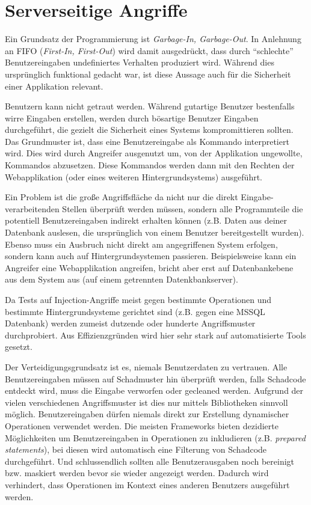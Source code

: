 \chapter{Serverseitige Angriffe}

Ein Grundsatz der Programmierung ist \textit{Garbage-In, Garbage-Out}. In Anlehnung an FIFO (\textit{First-In, First-Out}) wird damit ausgedrückt, dass durch ``schlechte'' Benutzereingaben undefiniertes Verhalten produziert wird. Während dies ursprünglich funktional gedacht war, ist diese Aussage auch für die Sicherheit einer Applikation relevant.

Benutzern kann nicht getraut werden. Während gutartige Benutzer bestenfalls wirre Eingaben erstellen, werden durch bösartige Benutzer Eingaben durchgeführt, die gezielt die Sicherheit eines Systems kompromittieren sollten. Das Grundmuster ist, dass eine Benutzereingabe als Kommando interpretiert wird. Dies wird durch Angreifer ausgenutzt um, von der Applikation ungewollte, Kommandos abzusetzen. Diese Kommandos werden dann mit den Rechten der Webapplikation (oder eines weiteren Hintergrundsystems) ausgeführt.

Ein Problem ist die große Angriffsfläche da nicht nur die direkt Eingabe-verarbeitenden Stellen überprüft werden müssen, sondern alle Programmteile die potentiell Benutzereingaben indirekt erhalten können (z.B. Daten aus deiner Datenbank auslesen, die ursprünglich von einem Benutzer bereitgestellt wurden). Ebenso muss ein Ausbruch nicht direkt am angegriffenen System erfolgen, sondern kann auch auf Hintergrundsystemen passieren. Beispielsweise kann ein Angreifer eine Webapplikation angreifen, bricht aber erst auf Datenbankebene aus dem System aus (auf einem getrennten Datenkbankserver).

Da Tests auf Injection-Angriffe meist gegen bestimmte Operationen und bestimmte Hintergrundsysteme gerichtet sind (z.B. gegen eine MSSQL Datenbank) werden zumeist dutzende oder hunderte Angriffsmuster durchprobiert. Aus Effizienzgründen wird hier sehr stark auf automatisierte Tools gesetzt.

Der Verteidigungsgrundsatz ist es, niemals Benutzerdaten zu vertrauen. Alle Benutzereingaben müssen auf Schadmuster hin überprüft werden, falls Schadcode entdeckt wird, muss die Eingabe verworfen oder gecleaned werden. Aufgrund der vielen verschiedenen Angriffsmuster ist dies nur mittels Bibliotheken sinnvoll möglich. Benutzereingaben dürfen niemals direkt zur Erstellung dynamischer Operationen verwendet werden. Die meisten Frameworks bieten dezidierte Möglichkeiten um Benutzereingaben in Operationen zu inkludieren (z.B. \textit{prepared statements}), bei diesen wird automatisch eine Filterung von Schadcode durchgeführt. Und schlussendlich sollten alle Benutzerausgaben noch bereinigt bzw. maskiert werden bevor sie wieder angezeigt werden. Dadurch wird verhindert, dass Operationen im Kontext eines anderen Benutzers ausgeführt werden.

